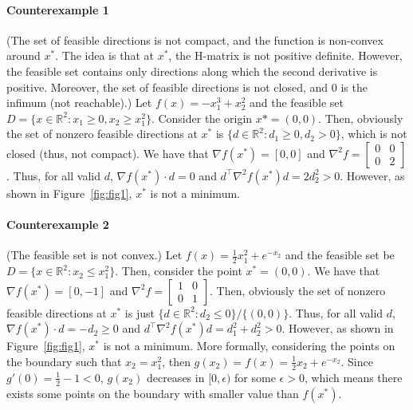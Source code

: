 \documentclass[11pt]{report}
\newcommand{\T}{\intercal}
\begin{document}
\paragraph{Counterexample 1} (The set of feasible directions is not compact, and the function is non-convex around $x^*$. The idea is that at $x^*$, the H-matrix is not positive definite. However, the feasible set contains only directions along which the second derivative is positive. Moreover, the set of feasible directions is not closed, and $0$ is the infimum (not reachable).) Let $f(x) = -x_1^3 + x_2^2$ and the feasible set $D = \{x \in \mathbb{R}^2: x_1 \geq 0, x_2 \geq x_1^2\}$. Consider the origin $x* = (0, 0)$. Then, obviously the set of nonzero feasible directions at $x^*$ is $\{d\in\mathbb{R}^2: d_1 \geq 0, d_2 > 0\}$, which is not closed (thus, not compact). We have that $\nabla f(x^*) = [0, 0]$ and $\nabla^2 f = \begin{bmatrix}0 & 0\\0 & 2\end{bmatrix}$. Thus, for all valid $d$, $\nabla f(x^*) \cdot d = 0$ and $d^\T \nabla^2 f(x^*) d = 2 d_2^2 > 0$. However, as shown in Figure~\ref{fig:fig1}, $x^*$ is not a minimum.
\paragraph{Counterexample 2} (The feasible set is not convex.) Let $f(x) = \frac{1}{2}x_1^2 + e^{-x_2}$ and the feasible set be $D = \{x \in \mathbb{R}^2: x_2 \leq x_1^2\}$. Then, consider the point $x^* = (0,0)$. We have that $\nabla f(x^*) = [0, -1]$ and $\nabla^2 f = \begin{bmatrix}1 & 0\\0 & 1\end{bmatrix}$. Then, obviously the set of nonzero feasible directions at $x^*$ is just $\{d \in \mathbb{R}^2: d_2 \leq 0\}/\{(0,0)\}$. Thus, for all valid $d$, $\nabla f(x^*) \cdot d = -d_2 \geq 0$ and $d^\T \nabla^2 f(x^*) d = d_1^2 + d_2^2 > 0$. However, as shown in Figure~\ref{fig:fig1}, $x^*$ is not a minimum. More formally, considering the points on the boundary such that $x_2 = x_1^2$, then $g(x_2) = f(x) = \frac{1}{2}x_2 + e^{-x_2}$. Since $g'(0) = \frac{1}{2} - 1 < 0$, $g(x_2)$ decreases in $[0,\epsilon)$ for some $\epsilon > 0$, which means there exists some points on the boundary with smaller value than $f(x^*)$.
\end{document}

